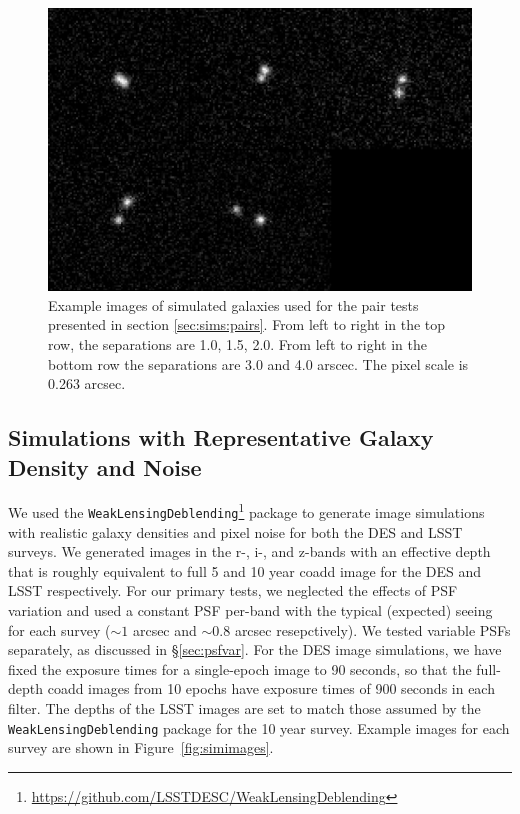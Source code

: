 \documentclass[fleqn,useAMS,usenatbib]{mnras}
\begin{document}
\begin{figure}
    \includegraphics[width=\textwidth]{figures/bdk-comb.png}
    \caption{Example images of simulated galaxies used for the pair tests
    presented in section \ref{sec:sims:pairs}.  From left to right in the top row,
    the separations are 1.0, 1.5, 2.0. From left to right in the bottom row the
    separations are 3.0 and 4.0 arscec. The pixel scale is 0.263 arcsec.
    \label{fig:pairs}}
\end{figure}

\subsection{Simulations with Representative Galaxy Density and Noise}
\label{sec:sims:realgals}

We used the
\texttt{WeakLensingDeblending}\footnote{\url{https://github.com/LSSTDESC/WeakLensingDeblending}}
package to generate image simulations with realistic galaxy densities and
pixel noise for both the DES and LSST surveys. We generated images in the r-,
i-, and z-bands with an effective depth that is roughly equivalent to full 5
and 10 year coadd image for the DES and LSST respectively. For our primary
tests, we neglected the effects of PSF variation and used a constant PSF
per-band with the typical (expected) seeing for each survey ($\sim\!1$ arcsec
and $\sim\!0.8$ arcsec resepctively). We tested variable PSFs separately, as
discussed in \S \ref{sec:psfvar}.  For the DES image simulations, we have fixed
the exposure times for a single-epoch image to 90 seconds, so that the
full-depth coadd images from 10 epochs have exposure times of 900 seconds in each
filter. The depths of the LSST images
are set to match those assumed by the \texttt{WeakLensingDeblending} package for the 10 year
survey. Example images for each survey are shown in Figure~\ref{fig:simimages}.
\end{document}
